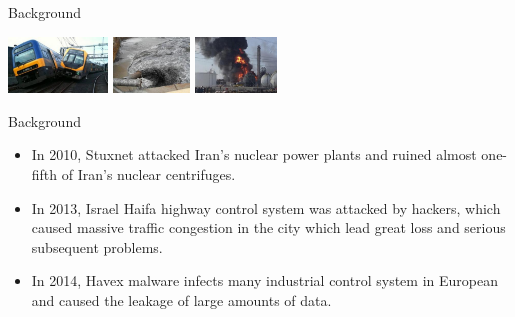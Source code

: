 \documentclass[10pt, compress]{beamer}
\begin{document}
\begin{frame}{Background}
\begin{center}
\begin{minipage}[m]{0.9\textwidth}
        \includegraphics[height=1.5cm]{Figures/Introduction/Fig7.png} \hfill
        \includegraphics[height=1.5cm]{Figures/Introduction/Fig8.png} \hfill
        \includegraphics[height=1.5cm]{Figures/Introduction/Fig9.png}
      \end{minipage}
    \end{center}
\end{frame}

\begin{frame}{Background}
    \begin{itemize}
      \item In 2010, Stuxnet attacked Iran's nuclear power plants and ruined almost one-fifth of Iran's nuclear centrifuges.
      \item In 2013, Israel Haifa highway control system  was attacked by hackers, which caused massive traffic congestion in the city which lead great loss and serious subsequent problems.
      \item In 2014, Havex malware infects many industrial control system in European  and caused the leakage of large amounts of data.
    \end{itemize}

    \begin{minipage}[c][][t]{0.6\textwidth}
      
    \end{minipage}
    \begin{minipage}[c][][t]{0.35\textwidth}
    \end{minipage}
\end{frame}
\end{document}
